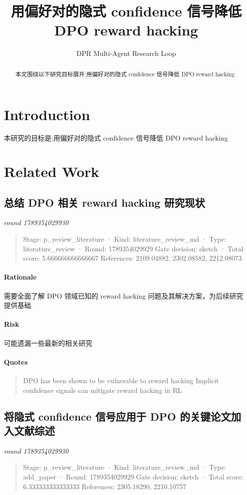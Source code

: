 \documentclass{article}
\title{用偏好对的隐式 confidence 信号降低 DPO reward hacking}
\author{DPR Multi-Agent Research Loop}
\affiliation{DPR Lab}
\begin{document}
\begin{abstract}
本文围绕以下研究目标展开:用偏好对的隐式 confidence 信号降低 DPO reward hacking
\end{abstract}

\section{Introduction}
本研究的目标是:用偏好对的隐式 confidence 信号降低 DPO reward hacking

\section{Related Work}
\subsection{总结 DPO 相关 reward hacking 研究现状}
\textit{round 1789354029930}\\
\begin{quote}
Stage: p\_review\_literature  ·  Kind: literature\_review\_md  ·  Type: literature\_review  ·  Round: 1789354029929
Gate decision: sketch  ·  Total score: 5.666666666666667
References: 2109.04882, 2302.08582, 2212.08073
\end{quote}

\paragraph{Rationale}

需要全面了解 DPO 领域已知的 reward hacking 问题及其解决方案，为后续研究提供基础

\paragraph{Risk}

可能遗漏一些最新的相关研究

\paragraph{Quotes}
\begin{quote}
DPO has been shown to be vulnerable to reward hacking
Implicit confidence signals can mitigate reward hacking in RL
\end{quote}

\subsection{将隐式 confidence 信号应用于 DPO 的关键论文加入文献综述}
\textit{round 1789354029930}\\
\begin{quote}
Stage: p\_review\_literature  ·  Kind: literature\_review\_md  ·  Type: add\_paper  ·  Round: 1789354029929
Gate decision: sketch  ·  Total score: 6.333333333333333
References: 2305.18290, 2210.10757
\end{quote}
\end{document}
